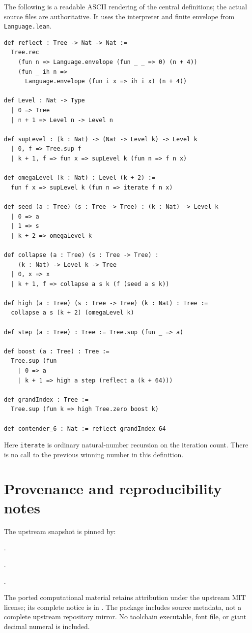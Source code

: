 \documentclass[11pt]{article}
\theoremstyle{definition}
\newcommand{\code}[1]{\texttt{#1}}
\begin{document}
The following is a readable ASCII rendering of the central definitions;
the actual source files are authoritative. It uses the interpreter and
finite envelope from \code{Language.lean}.
\begin{lstlisting}[basicstyle=\ttfamily\footnotesize]
def reflect : Tree -> Nat -> Nat :=
  Tree.rec
    (fun n => Language.envelope (fun _ _ => 0) (n + 4))
    (fun _ ih n =>
      Language.envelope (fun i x => ih i x) (n + 4))

def Level : Nat -> Type
  | 0 => Tree
  | n + 1 => Level n -> Level n

def supLevel : (k : Nat) -> (Nat -> Level k) -> Level k
  | 0, f => Tree.sup f
  | k + 1, f => fun x => supLevel k (fun n => f n x)

def omegaLevel (k : Nat) : Level (k + 2) :=
  fun f x => supLevel k (fun n => iterate f n x)

def seed (a : Tree) (s : Tree -> Tree) : (k : Nat) -> Level k
  | 0 => a
  | 1 => s
  | k + 2 => omegaLevel k

def collapse (a : Tree) (s : Tree -> Tree) :
    (k : Nat) -> Level k -> Tree
  | 0, x => x
  | k + 1, f => collapse a s k (f (seed a s k))

def high (a : Tree) (s : Tree -> Tree) (k : Nat) : Tree :=
  collapse a s (k + 2) (omegaLevel k)

def step (a : Tree) : Tree := Tree.sup (fun _ => a)

def boost (a : Tree) : Tree :=
  Tree.sup (fun
    | 0 => a
    | k + 1 => high a step (reflect a (k + 64)))

def grandIndex : Tree :=
  Tree.sup (fun k => high Tree.zero boost k)

def contender_6 : Nat := reflect grandIndex 64
\end{lstlisting}
Here \code{iterate} is ordinary natural-number recursion on the iteration
count. There is no call to the previous winning number in this definition.

\section{Provenance and reproducibility notes}

The upstream snapshot is pinned by:
\begin{description}[leftmargin=0pt,labelindent=0pt]
\item[Repository commit] .
\item[Contender.v blob] .
\item[README.md blob] .
\end{description}
The ported computational material retains attribution under the upstream
MIT license; its complete notice is in
. The package includes source metadata,
not a complete upstream repository mirror. No toolchain executable, font
file, or giant decimal numeral is included.
\end{document}
